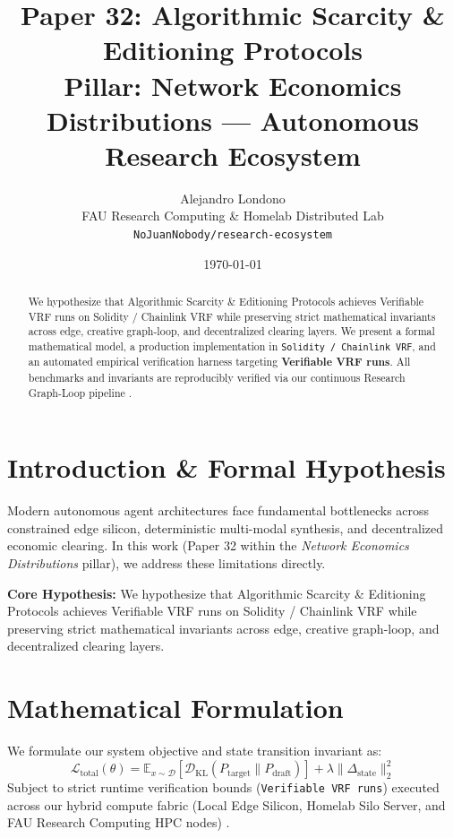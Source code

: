 \documentclass[10pt,twocolumn]{article}
\title{\textbf{Paper 32: Algorithmic Scarcity \& Editioning Protocols}\\
\large Pillar: Network Economics Distributions --- Autonomous Research Ecosystem}
\author{
  Alejandro Londono \\
  FAU Research Computing \& Homelab Distributed Lab \\
  \texttt{NoJuanNobody/research-ecosystem}
}
\date{\today}
\begin{document}
\maketitle

\begin{abstract}
We hypothesize that Algorithmic Scarcity \& Editioning Protocols achieves Verifiable VRF runs on Solidity / Chainlink VRF while preserving strict mathematical invariants across edge, creative graph-loop, and decentralized clearing layers.
We present a formal mathematical model, a production implementation in \texttt{Solidity / Chainlink VRF}, and an automated empirical verification harness targeting \textbf{Verifiable VRF runs}. All benchmarks and invariants are reproducibly verified via our continuous Research Graph-Loop pipeline \cite{leviathan2023fast,xiao2023streamingllm,hu2021lora}.
\end{abstract}

\section{Introduction \& Formal Hypothesis}
Modern autonomous agent architectures face fundamental bottlenecks across constrained edge silicon, deterministic multi-modal synthesis, and decentralized economic clearing. In this work (Paper 32 within the \textit{Network Economics Distributions} pillar), we address these limitations directly.

\textbf{Core Hypothesis:} We hypothesize that Algorithmic Scarcity \& Editioning Protocols achieves Verifiable VRF runs on Solidity / Chainlink VRF while preserving strict mathematical invariants across edge, creative graph-loop, and decentralized clearing layers.

\section{Mathematical Formulation}
We formulate our system objective and state transition invariant as:
\begin{equation}
\mathcal{L}_{\text{total}}(\theta) = \mathbb{E}_{x \sim \mathcal{D}}\left[\mathcal{D}_{\text{KL}}(P_{\text{target}} \parallel P_{\text{draft}})\right] + \lambda \|\Delta_{\text{state}}\|_2^2
\end{equation}
Subject to strict runtime verification bounds (\texttt{Verifiable VRF runs}) executed across our hybrid compute fabric (Local Edge Silicon, Homelab Silo Server, and FAU Research Computing HPC nodes) \cite{rafailov2023dpo,shapley1953value,hanson2003combinatorial}.
\end{document}
